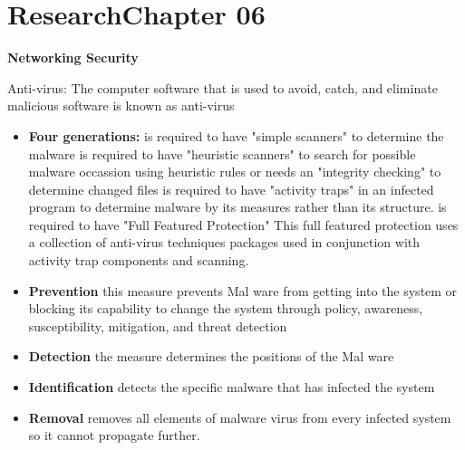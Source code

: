 \documentclass[../CIT288SecurityResearchNotebook.tex]{subfiles}
\begin{document}

\chapter[Research Ch. 06]{Research\linebreak[1] Chapter 06 \hspace*{\fill}{\date}}
\noindent\textbf{{Networking Security} }                             

Anti-virus: The computer software that is used to avoid, catch, and eliminate malicious software is known as anti-virus
\begin{itemize}
	\item{\bf{Four generations:}}
	 is required to have "simple scanners" to determine the malware
		 is required to have "heuristic scanners" to search for possible malware occassion using heuristic rules or needs an "integrity checking" to determine changed files
		 is required to have "activity traps" in an infected program to determine malware by its measures rather than its structure.
		 is required to have "Full Featured Protection" This full featured protection uses a collection of anti-virus techniques packages used in conjunction with activity trap components and scanning.
\end{itemize}

\begin{itemize}
\item{\bf{Prevention}} this measure prevents Mal ware from getting into the system or blocking its capability to change the system through policy, awareness, susceptibility, mitigation, and threat detection
\item{\bf{Detection}} the measure determines the positions of the Mal ware
\item{\bf{Identification}} detects the specific malware that has infected the system
\item{\bf{Removal}} removes all elements of malware virus from every infected system so it cannot propagate further.
\end{itemize}
\end{document}
